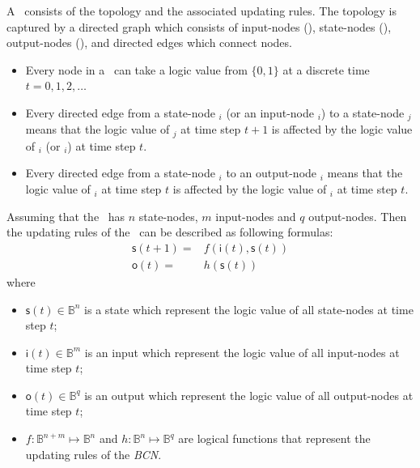 \begin{definition} A \BCN\ consists of the  topology and the associated updating rules. The topology is captured by a directed graph which consists of input-nodes (\Input), state-nodes (\State), output-nodes (\Output), and directed edges which connect nodes. 
	\begin{itemize}
	\item Every node in a \BCN\ can take a logic value from $\{0,1\}$ at a discrete time $t=0, 1, 2,\ldots$ 
	
	\item Every directed edge from a state-node \State$_i$ (or an input-node \Input$_i$) to a state-node \State$_j$ means that the logic value of \State$_j$ at time step $t+1$ is affected by the logic value of \State$_i$ (or \Input$_i$)  at time step $t$. 
	
	\item Every directed edge from a state-node \State$_i$ to an output-node \Output$_i$ means that the logic value of \Output$_i$ at time step $t$ is affected by the logic value of \State$_i$ at time step $t$.  
	\end{itemize}

Assuming that the \BCN\ has $n$ state-nodes, $m$ input-nodes and $q$ output-nodes. Then the updating rules of the \BCN\ can be described as following formulas:
\begin{equation}
\begin{split}
\mathsf{s}(t+1)=&f(\mathsf{i}(t),\mathsf{s}(t))\\
\mathsf{o}(t)=&h(\mathsf{s}(t))
\end{split}
\label{equ:1}
\end{equation}
where
\begin{itemize}
	\item $\mathsf{s}(t)\in \mathbb{B}^n$ is a state which represent the logic value of all state-nodes at time step $t$; 	
	\item $\mathsf{i}(t)\in \mathbb{B}^m$ is an input which represent the logic value of all input-nodes at time step $t$; 	
	\item $\mathsf{o}(t)\in \mathbb{B}^q$ is an output which represent the logic value of all output-nodes at time step $t$;  
	\item $f:\mathbb{B}^{n+m}\mapsto \mathbb{B}^n$ and $h:\mathbb{B}^n\mapsto \mathbb{B}^q$ are logical functions that represent the updating rules of the {\em BCN}. 
	\end{itemize}
 

\end{definition}


